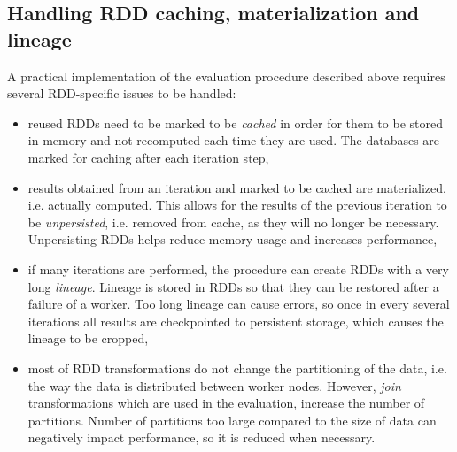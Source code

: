 \subsection{Handling RDD caching, materialization and lineage}
A practical implementation of the evaluation procedure described above requires several RDD-specific issues to be handled:
\begin{itemize}
\item reused RDDs need to be marked to be \emph{cached} in order for them to be stored in memory and not recomputed each time they are used. The databases are marked for caching after each iteration step,
\item results obtained from an iteration and marked to be cached are materialized, i.e. actually computed. This allows for the results of the previous iteration to be \emph{unpersisted}, i.e. removed from cache, as they will no longer be necessary. Unpersisting RDDs helps reduce memory usage and increases performance,
\item if many iterations are performed, the procedure can create RDDs with a very long \emph{lineage}. Lineage is stored in RDDs so that they can be restored after a failure of a worker. Too long lineage can cause errors, so once in every several iterations all results are checkpointed to persistent storage, which causes the lineage to be cropped,
\item most of RDD transformations do not change the partitioning of the data, i.e. the way the data is distributed between worker nodes. However, \emph{join} transformations which are used in the evaluation, increase the number of partitions. Number of partitions too large compared to the size of data can negatively impact performance, so it is reduced when necessary.
\end{itemize}


